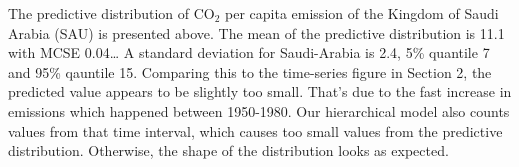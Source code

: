 \documentclass[
]{article}
\newenvironment{Shaded}{\begin{snugshade}}{\end{snugshade}}
\newcommand{\DecValTok}[1]{\textcolor[rgb]{0.00,0.00,0.81}{#1}}
\newcommand{\FloatTok}[1]{\textcolor[rgb]{0.00,0.00,0.81}{#1}}
\newcommand{\KeywordTok}[1]{\textcolor[rgb]{0.13,0.29,0.53}{\textbf{#1}}}
\newcommand{\NormalTok}[1]{#1}
\newcommand{\OperatorTok}[1]{\textcolor[rgb]{0.81,0.36,0.00}{\textbf{#1}}}
\newcommand{\StringTok}[1]{\textcolor[rgb]{0.31,0.60,0.02}{#1}}
\begin{document}
\begin{Shaded}
\end{Shaded}

The predictive distribution of CO\(_2\) per capita emission of the
Kingdom of Saudi Arabia (SAU) is presented above. The mean of the
predictive distribution is 11.1 with MCSE 0.04\ldots{} A standard
deviation for Saudi-Arabia is 2.4, 5\% quantile 7 and 95\% qauntile 15.
Comparing this to the time-series figure in Section 2, the predicted
value appears to be slightly too small. That's due to the fast increase
in emissions which happened between 1950-1980. Our hierarchical model
also counts values from that time interval, which causes too small
values from the predictive distribution. Otherwise, the shape of the
distribution looks as expected.
\end{document}
